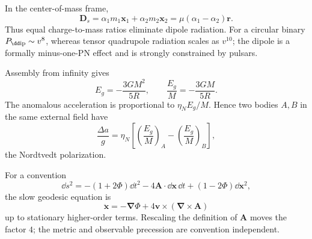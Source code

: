 \begin{solution}
In the center-of-mass frame,
\[
\bm D_s=\alpha_1m_1\bm x_1+\alpha_2m_2\bm x_2
=\mu(\alpha_1-\alpha_2)\bm r.
\]
Thus equal charge-to-mass ratios eliminate dipole radiation.  For a circular
binary \(P_{\rm \dd ip}\sim v^8\), whereas tensor quadrupole radiation scales as
\(v^{10}\); the dipole is a formally minus-one-PN effect and is strongly
constrained by pulsars.
\end{solution}

\begin{solution}
Assembly from infinity gives
\[
E_g=-\frac{3GM^2}{5R},\qquad
\frac{E_g}{M}=-\frac{3GM}{5R}.
\]
The anomalous acceleration is proportional to
\(\eta_NE_g/M\).  Hence two bodies \(A,B\) in the same external field have
\[
\frac{\Delta a}{g}
=\eta_N\left[\left(\frac{E_g}{M}\right)_A
-\left(\frac{E_g}{M}\right)_B\right],
\]
the Nordtvedt polarization.
\end{solution}

\begin{solution}
For a convention
\[
\dd s^2=-(1+2\Phi)\dd t^2-4\bm A\cdot\dd\bm x\,\dd t
+(1-2\Phi)\dd\bm x^2,
\]
the slow geodesic equation is
\[
\ddot{\bm x}=-\bm\nabla\Phi
+4\bm v\times(\bm\nabla\times\bm A)
\]
up to stationary higher-order terms.  Rescaling the definition of
\(\bm A\) moves the factor \(4\); the metric and observable precession are
convention independent.
\end{solution}
